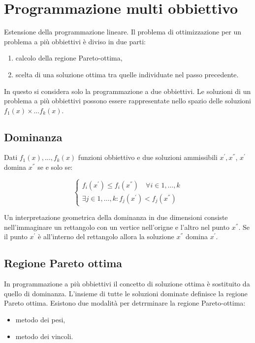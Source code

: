 \chapter{Programmazione multi obbiettivo}
Estensione della programmazione lineare. Il problema di ottimizzazione per un problema a più obbiettivi è diviso in due parti:

\begin{enumerate}
	\item calcolo della regione Pareto-ottima,
	\item scelta di una soluzione ottima tra quelle individuate nel passo precedente.
\end{enumerate}

In questo si considera solo la programmazione a due obbiettivi. Le soluzioni di un problema a più obbiettivi possono essere rappresentate nello spazio delle soluzioni $f_1(x) \times \dotsc f_k(x)$.

\section{Dominanza}
Dati $f_1(x), \dotsc, f_k(x)$ funzioni obbiettivo e due soluzioni ammissibili $x^{'}, x^{''}$, $x^{'}$ domina $x^{''}$ se e solo se:

\begin{equation}\label{dominanza}
	\begin{cases}
		f_i(x^{'}) \leq f_i(x^{''}) \quad \forall i \in 1, \dotsc, k \\
		\exists j \in 1, \dotsc, k : f_j(x^{'}) < f_j(x^{''})
	\end{cases}
\end{equation}

Un interpretazione geometrica della dominanza in due dimensioni consiste nell'immaginare un rettangolo con un vertice nell'origne e l'altro nel punto $x^{''}$. Se il punto $x^{'}$ è all'interno del rettangolo allora la soluzione $x^{''}$ domina $x^{'}$.

\section{Regione Pareto ottima}
In programmazione a più obbiettivi il concetto di soluzione ottima è sostituito da quello di dominanza. L'insieme di tutte le soluzioni dominate definisce la regione Pareto ottima. Esistono due modalità per detrrminare la regione Pareto-ottima:

\begin{itemize}
	\item metodo dei pesi,
	\item metodo dei vincoli.
\end{itemize}

